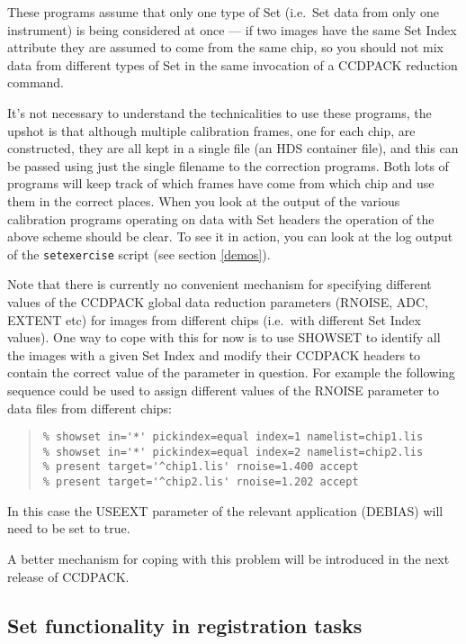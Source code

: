 \documentclass[twoside,11pt]{article}
\newcommand{\htmlref}[2]{#1}
\renewcommand{\_}{\texttt{\symbol{95}}}
\newenvironment{myquote}{\begin{quote}\begin{small}}{\end{small}\end{quote}}
\newcommand{\text}[1]{{\small \tt #1}}
\newcommand{\routine}[1]{{\sc #1}}
\newcommand{\xroutine}[1]{\htmlref{{\sc #1}}{#1}}
\begin{document}
These programs assume that only one type of Set 
(i.e.\ Set data from only one instrument) 
is being considered at once --- if two images have the same Set Index
attribute they are assumed to come from the same chip,
so you should not mix data from different types of Set in the same
invocation of a CCDPACK reduction command.

It's not necessary to understand the technicalities to use these programs,
the upshot is that although multiple calibration frames,
one for each chip, are constructed, they are all kept in a single file
(an HDS container file),
and this can be passed using just the single filename
to the correction programs.
Both lots of programs will keep track of which frames have come
from which chip and use them in the correct places.
When you look at the output of the various calibration programs
operating on data with Set headers the operation of the 
above scheme should be clear.  To see it in action, you can
look at the log output of the 
\text{setexercise} script (see section \ref{demos}).

Note that there is currently no convenient mechanism for specifying
different values of the CCDPACK global data reduction parameters
(RNOISE, ADC, EXTENT etc) for images from different chips 
(i.e.\ with different Set Index values).
One way to cope with this for now is to 
use \xroutine{SHOWSET} to identify all the images with a given 
Set Index and modify their CCDPACK headers to contain the correct
value of the parameter in question.
For example the following sequence could be used to assign different
values of the RNOISE parameter to data files from different chips:
\begin{myquote}
\begin{verbatim}
% showset in='*' pickindex=equal index=1 namelist=chip1.lis
% showset in='*' pickindex=equal index=2 namelist=chip2.lis
% present target='^chip1.lis' rnoise=1.400 accept
% present target='^chip2.lis' rnoise=1.202 accept
\end{verbatim}
\end{myquote}
In this case the USEEXT parameter of the relevant application 
(\routine{DEBIAS}) will need to be set to true.

A better mechanism for coping with this problem will 
be introduced in the next release of CCDPACK.

\subsection{Set functionality in registration tasks}
\end{document}

